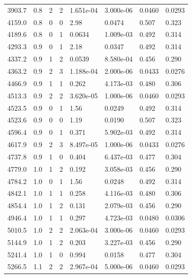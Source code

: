 \documentclass[preview]{standalone}
\begin{document}
{{{\begin{tabular}{L{1.2cm}C{1.2cm} C{0.3cm}C{0.5cm} C{1.4cm}C{1.4cm} C{1.4cm}C{1.4cm}}
  3903.7  &   0.8  & 2     &  2 &  1.651e-04  & 3.000e-06  & 0.0460 &  0.0293   \\ 
  4159.0  &   0.8  & 0     &  0 &  2.98  & 0.0474  & 0.507 &  0.323   \\ 
  4189.6  &   0.8  & 0     &  1 &  0.0634  & 1.009e-03  & 0.492 &  0.314   \\ 
  4293.3  &   0.9  & 0     &  1 &  2.18  & 0.0347  & 0.492 &  0.314   \\ 
  4337.2  &   0.9  & 1     &  2 &  0.0539  & 8.580e-04  & 0.456 &  0.290   \\ 
  4363.2  &   0.9  & 2     &  3 &  1.188e-04  & 2.000e-06  & 0.0433 &  0.0276   \\ 
  4466.9  &   0.9  & 1     &  1 &  0.262  & 4.173e-03  & 0.480 &  0.306   \\ 
  4513.3  &   0.9  & 2     &  2 &  3.620e-05  & 1.000e-06  & 0.0460 &  0.0293   \\ 
  4523.5  &   0.9  & 0     &  1 &  1.56  & 0.0249  & 0.492 &  0.314   \\ 
  4523.6  &   0.9  & 0     &  0 &  1.19  & 0.0190  & 0.507 &  0.323   \\ 
  4596.4  &   0.9  & 0     &  1 &  0.371  & 5.902e-03  & 0.492 &  0.314   \\ 
  4617.9  &   0.9  & 2     &  3 &  8.497e-05  & 1.000e-06  & 0.0433 &  0.0276   \\ 
  4737.8  &   0.9  & 1     &  0 &  0.404  & 6.437e-03  & 0.477 &  0.304   \\ 
  4779.0  &   1.0  & 1     &  2 &  0.192  & 3.058e-03  & 0.456 &  0.290   \\ 
  4784.2  &   1.0  & 0     &  1 &  1.56  & 0.0248  & 0.492 &  0.314   \\ 
  4842.1  &   1.0  & 1     &  1 &  0.258  & 4.116e-03  & 0.480 &  0.306   \\ 
  4854.4  &   1.0  & 1     &  2 &  0.131  & 2.079e-03  & 0.456 &  0.290   \\ 
  4946.4  &   1.0  & 1     &  1 &  0.297  & 4.723e-03  & 0.0480 &  0.0306   \\ 
  5010.5  &   1.0  & 2     &  2 &  2.063e-04  & 3.000e-06  & 0.0460 &  0.0293   \\ 
  5144.9  &   1.0  & 1     &  2 &  0.203  & 3.227e-03  & 0.456 &  0.290   \\ 
  5241.4  &   1.0  & 1     &  0 &  0.994  & 0.0158  & 0.477 &  0.304   \\ 
  5266.5  &   1.1  & 2     &  2 &  2.967e-04  & 5.000e-06  & 0.0460 &  0.0293   \\ 

\end{tabular}}}}
\end{document}
